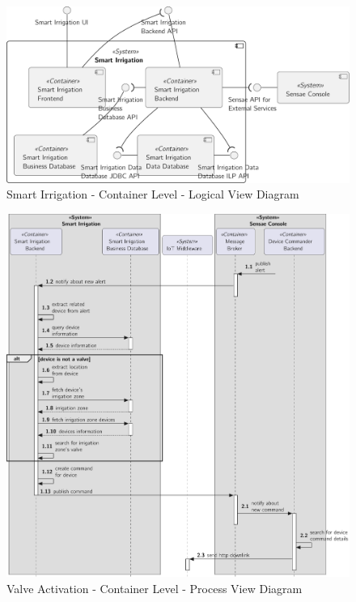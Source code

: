\begin{figure}[H]
   \centering
   \includegraphics[page=1,width=0.75\columnwidth]{assets/diagrams/design/architectural/level2/logical/smart-irrigation-context.pdf}
   \caption[Smart Irrigation - Container Level - Logical View Diagram]{Smart Irrigation - Container Level - Logical View Diagram}
   \label{fig:design:architecture:solutions:containers:logical:irrigation}
\end{figure}

\begin{figure}[H]
   \centering
   \includegraphics[page=1,width=0.9\columnwidth]{assets/diagrams/design/architectural/level2/process/smart-irrigation.pdf}
   \caption[Valve Activation Process - Container Level - Process View Diagram]{Valve Activation - Container Level - Process View Diagram}
   \label{fig:design:architecture:container:process:diagram:irrigation}
\end{figure}

